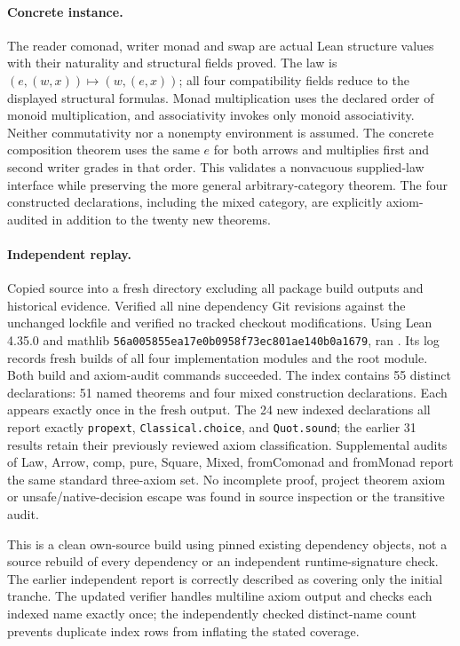 \documentclass{article}
\begin{document}
\paragraph{Concrete instance.}
The reader comonad, writer monad and swap are actual Lean structure values with their naturality and structural fields proved. The law is $(e,(w,x))\mapsto(w,(e,x))$; all four compatibility fields reduce to the displayed structural formulas. Monad multiplication uses the declared order of monoid multiplication, and associativity invokes only monoid associativity. Neither commutativity nor a nonempty environment is assumed. The concrete composition theorem uses the same $e$ for both arrows and multiplies first and second writer grades in that order. This validates a nonvacuous supplied-law interface while preserving the more general arbitrary-category theorem. The four constructed declarations, including the mixed category, are explicitly axiom-audited in addition to the twenty new theorems.

\paragraph{Independent replay.}
Copied source into a fresh directory excluding all package build outputs and historical evidence. Verified all nine dependency Git revisions against the unchanged lockfile and verified no tracked checkout modifications. Using Lean 4.35.0 and mathlib \texttt{56a005855ea17e0b0958f73ec801ae140b0a1679}, ran . Its log records fresh builds of all four implementation modules and the root module. Both build and axiom-audit commands succeeded. The index contains 55 distinct declarations: 51 named theorems and four mixed construction declarations. Each appears exactly once in the fresh output. The 24 new indexed declarations all report exactly \texttt{propext}, \texttt{Classical.choice}, and \texttt{Quot.sound}; the earlier 31 results retain their previously reviewed axiom classification. Supplemental audits of Law, Arrow, comp, pure, Square, Mixed, fromComonad and fromMonad report the same standard three-axiom set. No incomplete proof, project theorem axiom or unsafe/native-decision escape was found in source inspection or the transitive audit.

This is a clean own-source build using pinned existing dependency objects, not a source rebuild of every dependency or an independent runtime-signature check. The earlier independent report is correctly described as covering only the initial tranche. The updated verifier handles multiline axiom output and checks each indexed name exactly once; the independently checked distinct-name count prevents duplicate index rows from inflating the stated coverage.
\end{document}
